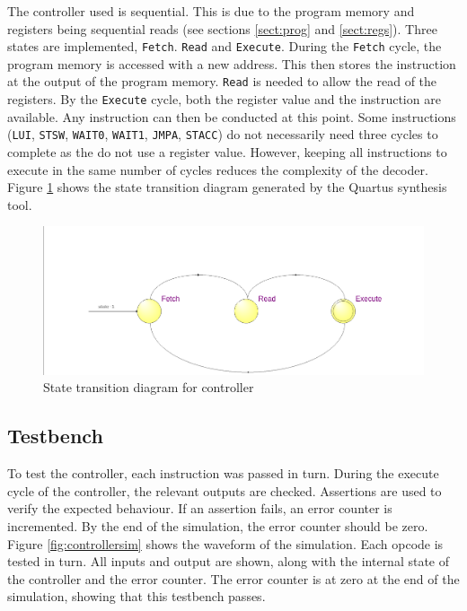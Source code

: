 


The controller used is sequential. 
This is due to the program memory and registers being sequential reads (see sections \ref{sect:prog} and \ref{sect:regs}).
Three states are implemented, \texttt{Fetch}. \texttt{Read} and \texttt{Execute}. 
During the \texttt{Fetch} cycle, the program memory is accessed with a new address. 
This then stores the instruction at the output of the program memory. 
\texttt{Read} is needed to allow the read of the registers. 
By the \texttt{Execute} cycle, both the register value and the instruction are available. 
Any instruction can then be conducted at this point.
Some instructions (\texttt{LUI}, \texttt{STSW}, \texttt{WAIT0}, \texttt{WAIT1}, \texttt{JMPA}, \texttt{STACC}) do not necessarily need three cycles to complete as the do not use a register value.
However, keeping all instructions to execute in the same number of cycles reduces the complexity of the decoder. 
Figure \ref{fig:controllerasm} shows the state transition diagram generated by the Quartus synthesis tool.

\begin{figure}
\includegraphics[width=\textwidth]{Figures/cpu_control_state.png}
\caption{State transition diagram for controller}
\label{fig:controllerasm}
\end{figure}

\subsection{Testbench}

To test the controller, each instruction was passed in turn.
During the execute cycle of the controller, the relevant outputs are checked. 
Assertions are used to verify the expected behaviour. 
If an assertion fails, an error counter is incremented. 
By the end of the simulation, the error counter should be zero.
Figure \ref{fig:controllersim} shows the waveform of the simulation.
Each opcode is tested in turn.
All inputs and output are shown, along with the internal state of the controller and the error counter.
The error counter is at zero at the end of the simulation, showing that this testbench passes. 

